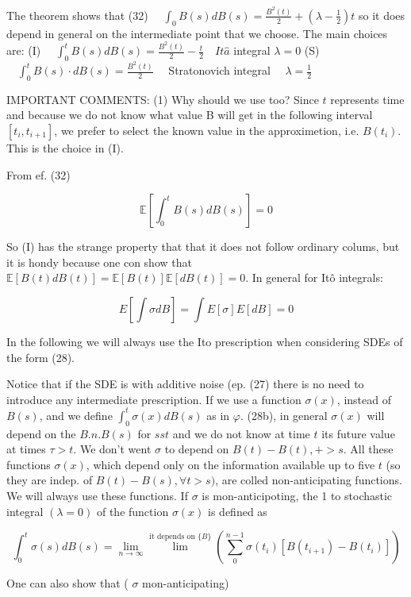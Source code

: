 The theorem shows that
(32) $\quad \int_{0} B(s) d B(s)=\frac{B^{2}(t)}{2}+\left(\lambda-\frac{1}{2}\right) t$
so it does depend in general on the intermediate point that we choose. The main choices are:
(I) $\quad \int_{0}^{t} B(s) d B(s)=\frac{B^{2}(t)}{2}-\frac{t}{2} \quad It \hat{a}$ integral $\lambda=0$
(S) $\quad \int_{0}^{t} B(s) \cdot d B(s)=\frac{B^{2}(t)}{2} \quad$ Stratonovich integral $\quad \lambda=\frac{1}{2}$

IMPORTANT COMMENTS:
(1) Why should we use too? Since $t$ represents time and because we do not know what value B will get in the following interval $\left[t_{i}, t_{i+1}\right]$, we prefer to select the known value in the approximetion, i.e. $B
\left(t_{i}\right)$. This is the choice in (I).

From ef. (32)

$$ 
\mathbb{E}\left[
\int_{0}^{t} B(s) d B(s)\right]=0
$$ 

So (I) has the strange property that that it does not follow ordinary colums, but it is hondy because one con show that $\mathbb{E}[B(t) d B(t)]=\mathbb{E}[B(t)] \mathbb{E}[d B(t)]=0$. In general for Itô integrals:

$$ 
E
\left[
\int \sigma d B
\right]=\int E[\sigma] E[d B]=0
$$ 

In the following we will always use the Ito prescription when considering SDEs of the form (28).

Notice that if the SDE is with additive noise (ep. (27) there is no need to introduce any intermediate prescription.
If we use a function $\sigma(x)$, instead of $B(s)$, and we define $\int_{0}^{t} \sigma(x) d B(s)$ as in $\varphi$. (28b), in general $\sigma(x)$ will depend on the $B . n . B(s)$ for $s s t$ and we do not know at time $t$ its future value at times $\tau>t$. We don't went $\sigma$ to depend on $B(t)-B(t),+>s$. All these functions $\sigma(x)$, which depend only on the information available up to five $t$ (so they are indep. of $B(t)-B(s), \forall t>s)$, are colled non-anticipating functions. We will always use these functions.
If $\sigma$ is mon-anticipoting, the 1 to stochastic integral $(\lambda=0)$ of the function $\sigma(x)$ is defined as

$$ 
\int_{0}^{t} \sigma(s) d B(s)=\lim _{n \rightarrow 
\infty} \lim ^{\text {it depends on }\{B\}}\left(\sum_{0}^{n-1} \sigma
\left(t_{i}\right)\left[B
\left(t_{i+1}\right)-B
\left(t_{i}\right)\right]\right)
$$ 

One can also show that ( $\sigma$ mon-anticipating)

